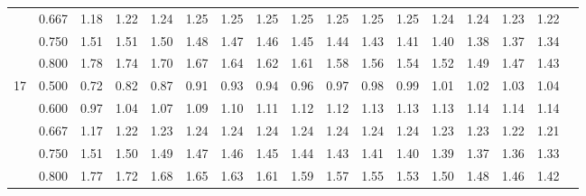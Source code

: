 {\begin{center}
\begin{tabular}{rrr@{\,}r@{\,}r@{\,}r@{\,}r@{\,}r@{\,}r@{\,}r
                   @{\,}r@{\,}r@{\,}r@{\,}r@{\,}r@{\,}r@{\,}r}
  &0.667&1.18&1.22&1.24&1.25&1.25&1.25&1.25&1.25&1.25&1.25&1.24&1.24&1.23&1.22\\
  &0.750&1.51&1.51&1.50&1.48&1.47&1.46&1.45&1.44&1.43&1.41&1.40&1.38&1.37&1.34\\
  &0.800&1.78&1.74&1.70&1.67&1.64&1.62&1.61&1.58&1.56&1.54&1.52&1.49&1.47&1.43\\
17&0.500&0.72&0.82&0.87&0.91&0.93&0.94&0.96&0.97&0.98&0.99&1.01&1.02&1.03&1.04\\
  &0.600&0.97&1.04&1.07&1.09&1.10&1.11&1.12&1.12&1.13&1.13&1.13&1.14&1.14&1.14\\
  &0.667&1.17&1.22&1.23&1.24&1.24&1.24&1.24&1.24&1.24&1.24&1.23&1.23&1.22&1.21\\
  &0.750&1.51&1.50&1.49&1.47&1.46&1.45&1.44&1.43&1.41&1.40&1.39&1.37&1.36&1.33\\
  &0.800&1.77&1.72&1.68&1.65&1.63&1.61&1.59&1.57&1.55&1.53&1.50&1.48&1.46&1.42
\end{tabular}
\end{center}

\newpage


}
